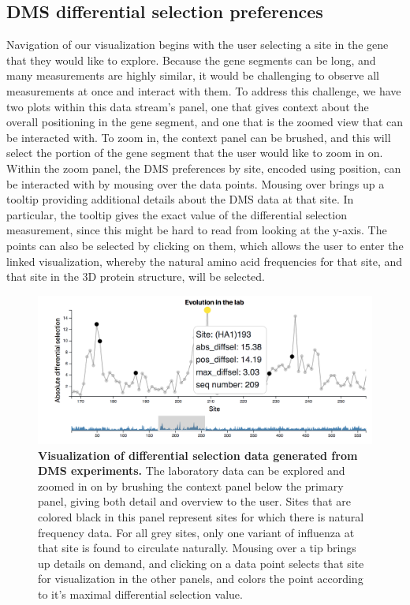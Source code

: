 \documentclass[sigchi]{acmart}
\begin{document}
\subsection{DMS differential selection preferences}
Navigation of our visualization begins with the user selecting a site in the gene that they would like to explore. Because the gene segments can be long, and many measurements are highly similar, it would be challenging to observe all measurements at once and interact with them. To address this challenge, we have two plots within this data stream’s panel, one that gives context about the overall positioning in the gene segment, and one that is the zoomed view that can be interacted with.  To zoom in, the context panel can be brushed, and this will select the portion of the gene segment that the user would like to zoom in on. Within the zoom panel, the DMS preferences by site, encoded using position, can be interacted with by mousing over the data points. Mousing over brings up a tooltip providing additional details about the DMS data at that site. In particular, the tooltip gives the exact value of the differential selection measurement, since this might be hard to read from looking at the y-axis. The points can also be selected by clicking on them, which allows the user to enter the linked visualization, whereby the natural amino acid frequencies for that site, and that site in the 3D protein structure, will be selected.

\begin{figure}[H]
	\includegraphics[width=1.0\textwidth]{dms-brushed-tooltip.png}
	\caption{\textbf{Visualization of differential selection data generated from DMS experiments.}
  The laboratory data can be explored and zoomed in on by brushing the context panel below the primary panel, giving both detail and overview to the user. Sites that are colored black in this panel represent sites for which there is natural frequency data. For all grey sites, only one variant of influenza at that site is found to circulate naturally. Mousing over a tip brings up details on demand, and clicking on a data point selects that site for visualization in the other panels, and colors the point according to it's maximal differential selection value.
	}
	\label{dms-data}
\end{figure}
\end{document}
